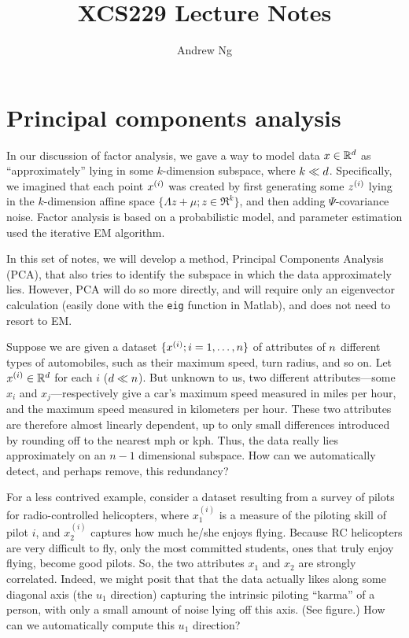 \documentclass{article}
\begin{document}
\title{XCS229 Lecture Notes}
\author{Andrew Ng}
\date{}
\maketitle


\setcounter{part}{10}
\part{Principal components analysis}


In our discussion of factor analysis, we gave a way to model data $x \in {\mathbb R}^{d}$ as ``approximately'' lying in some $k$-dimension subspace, where $k \ll {d}$. Specifically, we imagined that each point ${x^{(i)}}$ was created by first generating some ${z^{(i)}}$ lying in the $k$-dimension affine space $\{\Lambda z+\mu; z \in \Re^k\}$, and then adding $\Psi$-covariance noise. Factor analysis is based on a probabilistic model, and parameter estimation used the iterative EM algorithm.

In this set of notes, we will develop a method, Principal Components Analysis (PCA), that also tries to identify the subspace in which the data approximately lies. However, PCA will do so more directly, and will require only an eigenvector calculation (easily done with the {\tt eig} function in Matlab), and does not need to resort to EM.

Suppose we are given a dataset $\{{x^{(i)}}; i=1, \ldots, {n}\}$ of attributes of ${n}$ different types of automobiles, such as their maximum speed, turn radius, and so on.
Let ${x^{(i)}} \in {\mathbb R}^{d}$ for each $i$ (${d} \ll {n}$). But unknown to us, two different attributes---some $x_i$ and $x_j$---respectively give a car's maximum speed measured in miles per hour, and the maximum speed measured in kilometers per hour. These two attributes are therefore almost linearly dependent, up to only small differences introduced by rounding off to the nearest mph or kph. Thus, the data really lies approximately on an $n-1$ dimensional subspace. How can we automatically detect, and perhaps remove,
this redundancy?

For a less contrived example, consider a dataset resulting from a survey of pilots for radio-controlled helicopters, where $x^{(i)}_1$ is a measure of the piloting skill of pilot $i$, and $x^{(i)}_2$ captures how much he/she enjoys flying. Because RC helicopters are very difficult to fly, only the most committed students, ones that truly enjoy flying, become good pilots. So, the two attributes $x_1$ and $x_2$ are strongly correlated. Indeed, we might posit that that the data actually likes along some diagonal axis (the $u_1$ direction) capturing the intrinsic piloting ``karma'' of a person, with only a small amount of noise lying off this axis. (See figure.) How can we automatically compute this $u_1$ direction?
\end{document}
